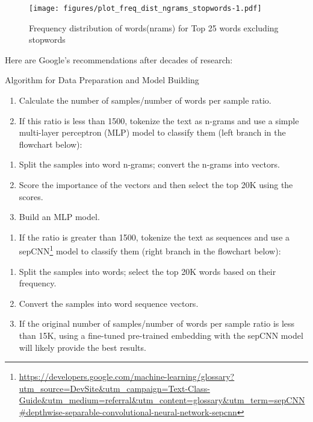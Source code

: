 \documentclass[
]{article}
\DeclareRobustCommand{\href}[2]{#2\footnote{\url{#1}}}
\providecommand{\tightlist}{%
  \setlength{\itemsep}{0pt}\setlength{\parskip}{0pt}}
\begin{document}
\begin{figure}
\centering
\texttt{[image: figures/plot\_freq\_dist\_ngrams\_stopwords-1.pdf]}
\caption{Frequency distribution of words(nrams) for Top 25 words
excluding stopwords\label{fig:model_2}}
\end{figure}

\newpage

Here are Google's recommendations after decades of research:

Algorithm for Data Preparation and Model Building

\begin{enumerate}
\def\labelenumi{\arabic{enumi}.}
\tightlist
\item
  Calculate the number of samples/number of words per sample ratio.
\item
  If this ratio is less than 1500, tokenize the text as n-grams and use
  a simple multi-layer perceptron (MLP) model to classify them (left
  branch in the flowchart below):
\end{enumerate}

\begin{enumerate}
\def\labelenumi{\alph{enumi}.}
\tightlist
\item
  Split the samples into word n-grams; convert the n-grams into vectors.
\item
  Score the importance of the vectors and then select the top 20K using
  the scores.
\item
  Build an MLP model.
\end{enumerate}

\begin{enumerate}
\def\labelenumi{\arabic{enumi}.}
\setcounter{enumi}{2}
\tightlist
\item
  If the ratio is greater than 1500, tokenize the text as sequences and
  use a
  \href{https://developers.google.com/machine-learning/glossary?utm_source=DevSite\&utm_campaign=Text-Class-Guide\&utm_medium=referral\&utm_content=glossary\&utm_term=sepCNN\#depthwise-separable-convolutional-neural-network-sepcnn}{sepCNN}
  model to classify them (right branch in the flowchart below):
\end{enumerate}

\begin{enumerate}
\def\labelenumi{\alph{enumi}.}
\tightlist
\item
  Split the samples into words; select the top 20K words based on their
  frequency.
\item
  Convert the samples into word sequence vectors.
\item
  If the original number of samples/number of words per sample ratio is
  less than 15K, using a fine-tuned pre-trained embedding with the
  sepCNN model will likely provide the best results.
\end{enumerate}
\end{document}
